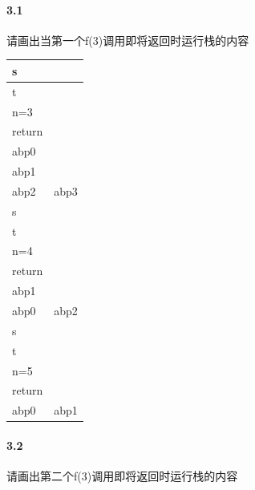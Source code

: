 \documentclass[UTF8]{ctexart} %
\begin{document}
\paragraph{3.1} 请画出当第一个f(3)调用即将返回时运行栈的内容

\begin{table}[H]
    \centering
    \begin{tabular}{|p{3cm}<{\centering}|p{2cm}<{\centering}|}
        \hline
        s      &      \\
        \hline
        t      &      \\
        \hline
        n=3    &      \\
        \hline
        return &      \\
        \hline
        abp0   &      \\
        \hline
        abp1   &      \\
        \hline
        abp2   & abp3 \\
        \hline
        s      &      \\
        \hline
        t      &      \\
        \hline
        n=4    &      \\
        \hline
        return &      \\
        \hline
        abp1   &      \\
        \hline
        abp0   & abp2 \\
        \hline
        s      &      \\
        \hline
        t      &      \\
        \hline
        n=5    &      \\
        \hline
        return &      \\
        \hline
        abp0   & abp1 \\
        \hline
    \end{tabular}
\end{table}

\paragraph{3.2} 请画出第二个f(3)调用即将返回时运行栈的内容
\end{document}
